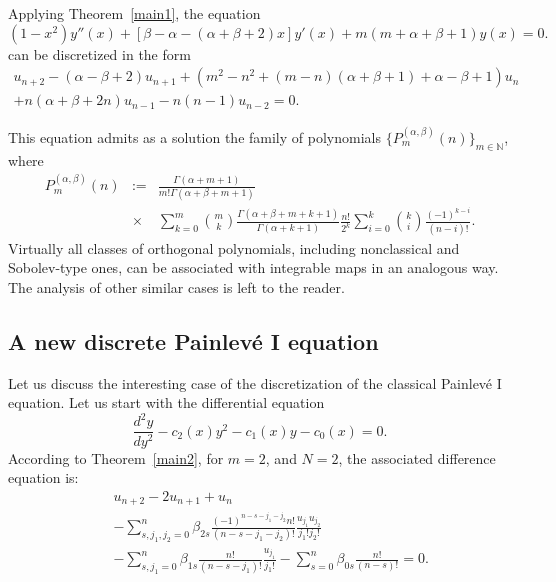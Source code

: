 \documentclass[10pt]{amsart}
\numberwithin{equation}{section}
\newcommand{\nn}{\nonumber}
\theoremstyle{definition}
\begin{document}
Applying Theorem~\ref{main1}, the equation
\begin{equation}
(1-x^{2})y''(x)+\left [\beta -\alpha -(\alpha +\beta +2)x\right ]y'(x)+m(m+
\alpha +\beta +1)y(x)=0.
\end{equation}
can be discretized in the form
\begin{eqnarray}
\nn
u_{n+2} - (\alpha -\beta +2)u_{n+1} +\left (m^{2}-n^{2}+(m-n) (
\alpha +\beta +1) + \alpha -\beta +1\right )u_{n}
\label{eq10.21}\quad
\\
+ n (\alpha +\beta +2 n)u_{n-1} -n(n-1) u_{n-2}=0.
\end{eqnarray}

This equation admits as a solution the family of polynomials
$\{P_{m}^{(\alpha ,\beta )}(n)\}_{m\in \mathbb{N}}$, where
\begin{eqnarray*}
P_{m}^{(\alpha ,\beta )}(n)&:=&
\frac{\Gamma (\alpha +m+1)}{m!\Gamma (\alpha +\beta +m+1)}
\\
&\times & \sum _{k=0}^{m}\binom{m}{k}
\frac{\Gamma (\alpha +\beta +m+k+1)}{\Gamma (\alpha +k+1)}
\frac{n! }{2^{k}}\sum _{i=0}^{k} \binom{k}{i}
\frac{(-1)^{k-i} }{(n-i)!}.
\nonumber
\end{eqnarray*}
Virtually all classes of orthogonal polynomials, including nonclassical
and Sobolev-type ones, can be associated with integrable maps in an analogous
way. The analysis of other similar cases is left to the reader.

\subsection{A new discrete Painlev\'e I equation}
\label{sec10.5}

Let us discuss the interesting case of the discretization of the classical
Painlev\'e I equation. Let us start with the differential equation
\begin{equation}
\frac{d^{2} y}{dy^{2}} - c_{2}(x) y^{2}- c_{1}(x) y - c_{0}(x) =0.
\label{eq10.22}
\end{equation}
According to Theorem~\ref{main2}, for $m=2$, and $N=2$, the associated
difference equation is:
\begin{eqnarray}
&&u_{n+2}-2u_{n+1}+u_{n}
\nonumber
\\
&& - \sum _{s,j_{1},j_{2}=0}^{n}\beta _{2s}
\frac{(-1)^{n-s -j_{1}-j_{2} } n!}{ (n-s-j_{1}-j_{2})! }
\frac{u_{j_{1}}u_{j_{2}}}{j_{1}!j_{2}!}
\nonumber
\\
&& - \sum _{s,j_{1}=0}^{n}\beta _{1s} \frac{ n!}{ (n-s-j_{1})! }
\frac{u_{j_{1}}}{j_{1}!} - \sum _{s=0}^{n}\beta _{0s }
\frac{n!}{(n-s )!} =0.
\label{eq10.23}
\end{eqnarray}
\end{document}
